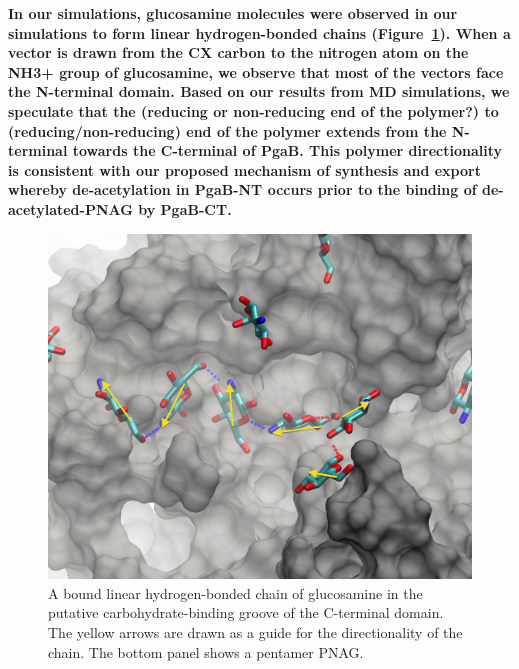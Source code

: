 \textbf{In our simulations, glucosamine molecules were observed in our simulations to form linear hydrogen-bonded chains (Figure~\ref{fig:directionality}). When a vector is drawn from the CX carbon to the nitrogen atom on the NH3+ group of glucosamine, we observe that most of the vectors face the N-terminal domain. Based on our results from MD simulations, we speculate that the (reducing or non-reducing end of the polymer?) to (reducing/non-reducing) end of the polymer extends from the N-terminal towards the C-terminal of PgaB.  This polymer directionality is consistent with our proposed mechanism of synthesis and export whereby de-acetylation in PgaB-NT occurs prior to the binding of de-acetylated-PNAG by PgaB-CT.}

\begin{figure}[htbp]
\centering
\includegraphics[width=6in]{figures/results4/glucosamine_binding_direction_suggestive.png}
\caption[Polymer directionality]{A bound linear hydrogen-bonded chain of glucosamine in the putative carbohydrate-binding groove of the C-terminal domain.  The yellow arrows are drawn as a guide for the directionality of the chain. The bottom panel shows a pentamer PNAG.}
\label{fig:directionality}
\end{figure}


